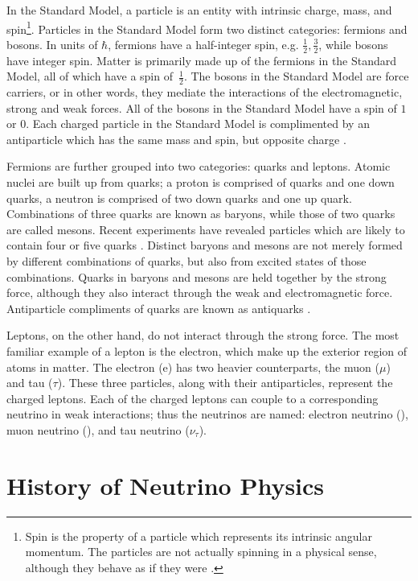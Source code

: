 In the Standard Model, a particle is an entity with intrinsic charge, mass, and
spin\footnote{Spin is the property of a particle which represents its intrinsic
angular momentum.  The particles are not actually spinning in a physical
sense, although they behave as if they were \cite{halzen1984quarks}.}.
Particles in the Standard Model form two distinct categories: fermions and
bosons.
In units of $\hbar$, fermions have a half-integer spin, e.g.
$\frac{1}{2}, \frac{3}{2}$, while bosons have integer spin.  Matter is primarily made up of the fermions in the Standard Model, all of which have a
spin of~$\frac{1}{2}$.
The bosons in the Standard Model are force carriers, or in other words, they
mediate the interactions of the electromagnetic, strong and weak forces.  All
of the bosons in the Standard Model have a spin of $1$ or $0$.  Each
charged particle in the Standard Model is complimented by an antiparticle which
has the same mass and spin, but opposite charge \cite{halzen1984quarks}.

Fermions are further grouped into two categories: quarks and leptons.  Atomic
nuclei are built up from quarks; a proton is comprised of quarks and one down
quarks, a neutron is comprised of two down quarks and one up quark.
Combinations of three quarks are known as baryons, while those of two quarks
are called mesons.  Recent experiments have revealed particles which are likely
to contain four or five quarks \cite{dias2013z_,barth2003evidence}.  Distinct
baryons and mesons are not merely formed by different combinations of quarks,
but also from excited states of those combinations.  Quarks in baryons and
mesons are held together by the strong force, although they also interact
through the weak and electromagnetic force.  Antiparticle compliments of quarks
are known as antiquarks   \cite{halzen1984quarks}.

Leptons, on the other hand, do not interact through the strong force.  The most
familiar example of a lepton is the electron, which make up the exterior region
of atoms in matter.  The electron (e) has two heavier counterparts, the muon
($\mu$) and tau ($\tau$).  These three particles, along with their
antiparticles, represent the charged leptons.  Each of the charged leptons can
couple to a corresponding neutrino in weak interactions; thus the neutrinos are
named: electron neutrino (\nue), muon neutrino (\numu), and tau neutrino
($\nu_\tau$).

\section{History of Neutrino Physics}

